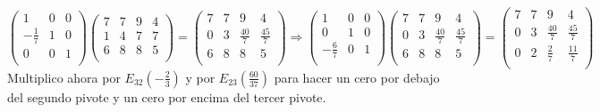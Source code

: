 \documentclass[11pt, a4paper]{article}
\newif\IfInSansMode
\theoremstyle{theorem-style}
\theoremstyle{definition-style}
\theoremstyle{remark-style}
\theoremstyle{example-style}
\begin{document}
$\begin{pmatrix}
1 & 0 & 0 \\
-\frac{1}{7} & 1 & 0 \\
0 & 0 & 1 \\
\end{pmatrix}
\begin{pmatrix}
7 & 7 & 9 & 4 \\
1 & 4 & 7 & 7 \\
6 & 8 & 8 & 5 \\
\end{pmatrix} = 
\begin{pmatrix}
7 & 7 & 9 & 4 \\
0 & 3 & \frac{40}{7} & \frac{45}{7} \\
6 & 8 & 8 & 5 \\
\end{pmatrix} \Longrightarrow
\begin{pmatrix}
1 & 0 & 0 \\
0 & 1 & 0 \\
-\frac{6}{7} & 0 & 1 \\
\end{pmatrix}
\begin{pmatrix}
7 & 7 & 9 & 4 \\
0 & 3 & \frac{40}{7} & \frac{45}{7} \\
6 & 8 & 8 & 5 \\
\end{pmatrix} = 
\begin{pmatrix}
7 & 7 & 9 & 4 \\
0 & 3 & \frac{40}{7} & \frac{45}{7} \\
0 & 2 & \frac{2}{7} & \frac{11}{7} \\
\end{pmatrix}$ \\

Multiplico ahora por $E_{32}(-\frac{2}{3})$ y por $E_{23}(\frac{60}{37})$ para hacer un cero por debajo del segundo pivote y un cero por encima del tercer pivote. \\
\end{document}
